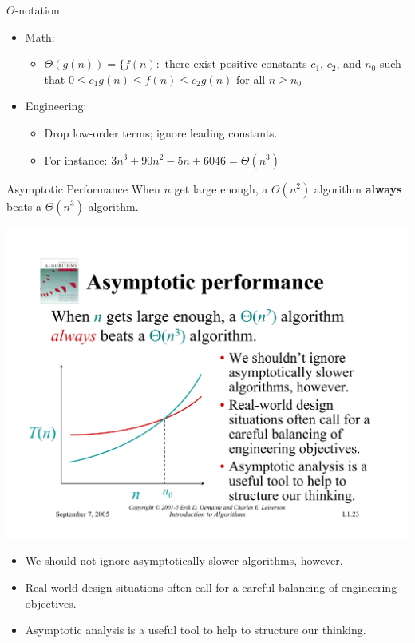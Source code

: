 \documentclass{beamer}
\begin{document}
\begin{frame}{$\Theta$-notation}
    \begin{itemize}
        \item Math:
        \begin{itemize}
            \item $\Theta(g(n)) = \{f(n):$ there exist positive constants $c_1$, $c_2$, and $n_0$ such that $0 \leq c_1g(n) \leq f(n) \leq c_2g(n)$ for all $n \geq n_0$
        \end{itemize}
        \item Engineering:
        \begin{itemize}
            \item Drop low-order terms; ignore leading constants.
            \item For instance: $3n^3+90n^2-5n+6046=\Theta(n^3)$
        \end{itemize}
    \end{itemize}
\end{frame}

\begin{frame}{Asymptotic Performance}
    When $n$ get large enough, a $\Theta(n^2)$ algorithm \textbf{always} beats a $\Theta(n^3)$ algorithm.\\
    \vspace{5mm}
    \begin{minipage}{0.5\textwidth}
        \centering
        \includegraphics[width=\textwidth, trim={0.38cm 1.25cm 12.8cm 8.26cm}, clip]{pages/lec1_23} \\
    \end{minipage}
    \begin{minipage}{0.48\textwidth}
        \begin{itemize}
            \item We should not ignore asymptotically slower algorithms, however.
            \item Real-world design situations often call for a careful balancing of engineering objectives.
            \item Asymptotic analysis is a useful tool to help to structure our thinking.
        \end{itemize}
    \end{minipage}
\end{frame}
\end{document}

